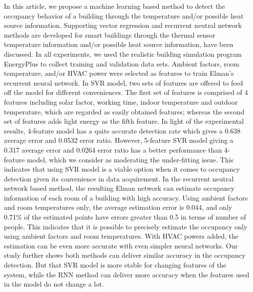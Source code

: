 \documentclass[acmtodaes]{acmtrans2m}
\begin{document}
In this article, we propose a machine learning based method to
detect the occupancy behavior of a building through the temperature
and/or possible heat source information. Supporting vector regression and recurrent neutral
network methods are developed for smart buildings through the thermal sensor
temperature information and/or possible heat source information, have
been discussed. In all experiments, we used the realistic building
simulation program EnergyPlus to collect training and validation
data sets. Ambient factors, room temperature, and/or HVAC power were
selected as features to train Elman's recurrent neural network. 
In SVR model, two sets of features are offered to feed off the
model for different conveniences. The first set of features is
comprised of 4 features including solar factor, working time, indoor
temperature and outdoor temperature, which are regarded as easily
obtained features; whereas the second set of features adds light
energy as the fifth feature. In light of the experimental results,
4-feature model has a quite accurate detection rate which gives a
0.638 average error and 0.0532 error ratio. However, 5-feature SVR
model giving a 0.317 average error and 0.0264 error ratio has a better
performance than 4-feature model, which we consider as moderating the
under-fitting issue. This indicates that using SVR model is a viable
option when it comes to occupancy detection given its convenience in
data acquirement. In the recurrent neutral network based method, the
resulting Elman network can estimate occupancy information of each
room of a building with high accuracy. Using ambient factors and room
temperatures only, the average estimation error is 0.044, and only
0.71\% of the estimated points have errors greater than 0.5 in terms
of number of people. This indicates that it is possible to precisely
estimate the occupancy only using ambient factors and room
temperatures. With HVAC powers added, the estimation can be even more
accurate with even simpler neural networks.  Our study further shows
both methods can deliver similar accuracy in the occupancy detection.
But that SVR model is more stable for changing features of the system,
while the RNN method can deliver more accuracy when the features used
in the model do not change a lot.

\end{document}
